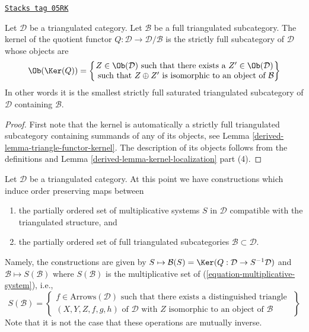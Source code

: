 \begin{lemma}
\label{derived-lemma-kernel-quotient}
\href{https://stacks.math.columbia.edu/tag/05RK}{\texttt{Stacks tag 05RK}}

Let $\mathcal{D}$ be a triangulated category.
Let $\mathcal{B}$ be a full triangulated subcategory.
The kernel of the quotient functor
$Q : \mathcal{D} \to \mathcal{D}/\mathcal{B}$
is the strictly full subcategory of $\mathcal{D}$ whose objects are
$$
\Ob(\Ker(Q)) =
\left\{
\begin{matrix}
Z \in \Ob(\mathcal{D})
\text{ such that there exists a }Z' \in \Ob(\mathcal{D}) \\
\text{ such that }Z \oplus Z'\text{ is isomorphic to an object of }\mathcal{B}
\end{matrix}
\right\}
$$
In other words it is the smallest strictly full saturated triangulated
subcategory of $\mathcal{D}$ containing $\mathcal{B}$.
\end{lemma}

\begin{proof}

First note that the kernel is automatically a strictly full
triangulated subcategory containing summands of any of its objects, see
Lemma \ref{derived-lemma-triangle-functor-kernel}.
The description of its objects follows from the definitions and
Lemma \ref{derived-lemma-kernel-localization} part (4).
\end{proof}

Let $\mathcal{D}$ be a triangulated category.
At this point we have constructions which induce order
preserving maps between
\begin{enumerate}
\item the partially ordered set of multiplicative systems $S$ in $\mathcal{D}$
compatible with the triangulated structure, and
\item the partially ordered set of full triangulated subcategories
$\mathcal{B} \subset \mathcal{D}$.
\end{enumerate}
Namely, the constructions are given by
$S \mapsto \mathcal{B}(S) = \Ker(Q : \mathcal{D} \to S^{-1}\mathcal{D})$
and $\mathcal{B} \mapsto S(\mathcal{B})$
where $S(\mathcal{B})$ is the multiplicative set of
(\ref{equation-multiplicative-system}), i.e.,
$$
S(\mathcal{B}) =
\left\{
\begin{matrix}
f \in \text{Arrows}(\mathcal{D})
\text{ such that there exists a distinguished triangle }\\
(X, Y, Z, f, g, h) \text{ of }\mathcal{D}\text{ with }
Z\text{ isomorphic to an object of }\mathcal{B}
\end{matrix}
\right\}
$$
Note that it is not the case that these operations are mutually inverse.

